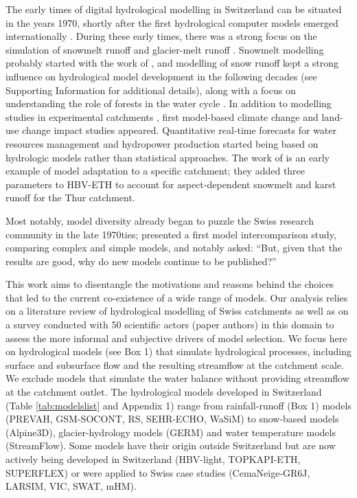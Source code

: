 \documentclass[10pt,a4paper]{article}
\begin{document}
The early times of digital hydrological modelling in Switzerland can be situated in the years 1970, shortly after the first hydrological computer models emerged internationally \citep{Peel2020}. During these early times, there was a strong focus on the simulation of snowmelt runoff \citep{Martinec1970, Braun1986} and glacier-melt runoff \citep{Braun1990}. Snowmelt modelling probably started with the work of \citet{Hoeck1952}, and modelling of snow runoff kept a strong influence on hydrological model development in the following decades (see Supporting Information for additional details), along with a focus on understanding the role of forests in the water cycle \citep{Keller1991, Forster1989}. In addition to modelling studies in experimental catchments \citep{Iorgulescu1994}, first model-based climate change \citep{Bultot1992a} and land-use change \citep{Jordan1990a} impact studies appeared. Quantitative real-time forecasts for water resources management \citep{Lugiez1969} and hydropower production \citep{Jensenlang1973} started being based on hydrologic models rather than statistical approaches. The work of \citet{Hottelet1993} is an early example of model adaptation to a specific catchment; they added three parameters to HBV-ETH to account for aspect-dependent snowmelt and karst runoff for the Thur catchment.

Most notably, model diversity already began to puzzle the Swiss research community in the late 1970ties; \citet{Naef1977} presented a first model intercomparison study, comparing complex and simple models, and \citet{Naef1981} notably asked: ``But, given that the results are good, why do new models continue to be published?''

This work aims to disentangle the motivations and reasons behind the choices that led to the current co-existence of a wide range of models. Our analysis relies on a literature review of hydrological modelling of Swiss catchments as well as on a survey conducted with 50 scientific actors (paper authors) in this domain to assess the more informal and subjective drivers of model selection. We focus here on hydrological models (see Box 1) that simulate hydrological processes, including surface and subsurface flow and the resulting streamflow at the catchment scale. We exclude models that simulate the water balance without providing streamflow at the catchment outlet. The hydrological models developed in Switzerland (Table \ref{tab:modelslist} and Appendix 1) range from rainfall-runoff (Box 1) models (PREVAH, GSM-SOCONT, RS, SEHR-ECHO, WaSiM) to snow-based models (Alpine3D), glacier-hydrology models (GERM) and water temperature models (StreamFlow). Some models have their origin outside Switzerland but are now actively being developed in Switzerland (HBV-light, TOPKAPI-ETH, SUPERFLEX) or were applied to Swiss case studies (CemaNeige-GR6J, LARSIM, VIC, SWAT, mHM).
\end{document}
